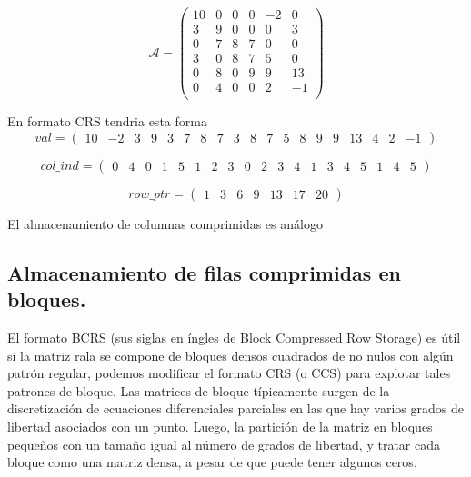 \documentclass[a4paper,openright,12pt, oneside]{book}
\begin{document}
\begin{equation}
\mathcal{A} =
\left(
\begin{array}{cccccc}
 
10& 0& 0& 0& -2& 0 \\

3& 9& 0& 0& 0& 3 \\
   
0& 7& 8& 7& 0& 0 \\

3& 0& 8& 7& 5& 0 \\
   
0& 8& 0& 9& 9& 13 \\
    
0& 4& 0& 0& 2& -1 \\
\end{array}
\right)
\end{equation}

En formato CRS tendria esta forma
\begin{equation}
val = 
\left(
\begin{array}{ccccccccccccccccccc}
10& -2& 3& 9& 3 & 7& 8& 7& 3& 8& 7& 5& 8& 9& 9& 13 & 4& 2& -1 
\end{array}
\right)
\end{equation}

\begin{equation}
col\_ind = 
\left(
\begin{array}{ccccccccccccccccccc}
0 & 4 & 0 & 1 & 5 & 1 & 2 & 3 & 0 & 2 & 3 & 4 & 1 & 3 & 4 & 5 & 1 & 4 & 5
\end{array}
\right)
\end{equation}


\begin{equation}
row\_ptr = 
\left(
\begin{array}{ccccccc}
1 & 3 & 6 & 9 & 13 & 17 & 20
\end{array}
\right)
\end{equation}




El almacenamiento de columnas comprimidas es an\'alogo

\subsection{Almacenamiento de filas comprimidas en bloques.}

El formato BCRS (sus siglas en \'ingles de Block Compressed Row Storage) es \'util si la matriz rala se compone de bloques densos cuadrados de no nulos con alg\'un patr\'on regular, podemos modificar el formato CRS (o CCS) para explotar tales patrones de bloque. Las matrices de bloque t\'ipicamente surgen de la discretizaci\'on de ecuaciones diferenciales parciales en las que hay varios grados de libertad asociados con un punto. Luego, la partici\'on de la matriz en bloques peque\~nos con un tama\~no igual al n\'umero de grados de libertad, y tratar cada bloque como una matriz densa, a pesar de que puede tener algunos ceros.
\end{document}
